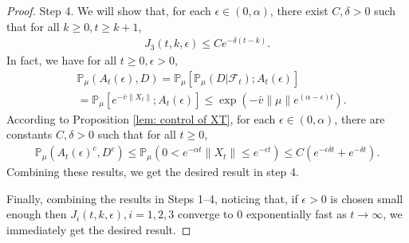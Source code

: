 \documentclass[12pt,a4paper]{amsart}
\theoremstyle{plain}
\theoremstyle{definition}
\numberwithin{equation}{section}
\begin{document}
\begin{proof}
    Step 4. 
    We will show that, for each $\epsilon\in (0,  \alpha)$, there exist $C,\delta>0$ such that for all $k\geq0, t\geq k+1$,
\begin{equation}\begin{split}\label{ineq: control of J3}
    J_3(t,k,\epsilon)\leq Ce^{-\delta (t-k)}.
\end{split}\end{equation}
    In fact, we have  for all $t\geq 0, \epsilon >0$,
\begin{equation}\begin{split}
    &\mathbb P_{\mu}(A_{t}(\epsilon), D) = \mathbb P_{\mu}[\mathbb P_{\mu}(D|\mathscr F_t);A_t(\epsilon)]
    \\&= \mathbb P_\mu[e^{-\bar v\|X_t\|};A_t(\epsilon)]
    \leq \exp({-\bar v \|\mu\|e^{(\alpha - \epsilon)t}}).
\end{split}\end{equation}
    According to Proposition \ref{lem: control of XT}, for each $\epsilon \in (0, \alpha)$, there are constants $C, \delta>0$ such that for all $t\geq 0$,
\begin{equation}\begin{split}
    \mathbb P_\mu(A_t(\epsilon)^c,D^c) \leq   \mathbb P_\mu(0 < e^{-\alpha t}\|X_t\|\leq e^{ - \epsilon t}) \leq C (e^{-\epsilon \delta t}+e^{-\delta t}).
\end{split}\end{equation}
    Combining these results, we get the desired result in step 4.

    Finally, combining the results in Steps 1--4, noticing that, if $\epsilon>0$ is chosen small enough then $J_{i}(t,k,\epsilon), i = 1,2,3$ converge to $0$ exponentially fast as $t\rightarrow\infty$, we immediately get the desired result.
\end{proof}
\end{document}
